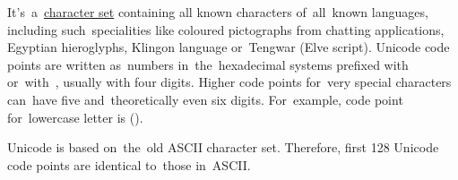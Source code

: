 \label{unicode}
It's~a~\hyperref[charactersetencoding]{character set} containing all known characters of~all~known languages, including such~specialities like coloured pictographs from chatting applications, Egyptian hieroglyphs, Klingon language or~Tengwar (Elve script).
Unicode code points are written as~numbers in~the~hexadecimal systems prefixed \mbox{with } \mbox{or with }, usually with four digits.
Higher code points for~very special characters can~have five and~theoretically even six digits.
For~example, code point for~lowercase letter  is  \mbox().

Unicode is based on~the~old ASCII character set.
Therefore, first 128 Unicode code points are identical to~those in~ASCII.
